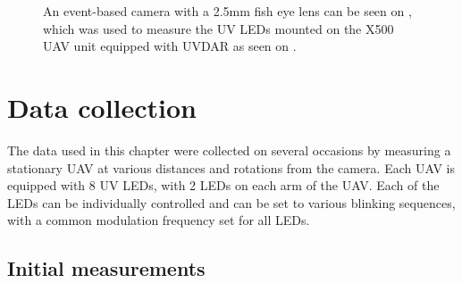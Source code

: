 \begin{figure}[H]
	\centering
	\caption{
  An event-based camera with a 2.5mm fish eye lens can be seen on , which was used to measure the UV LEDs mounted on the X500 UAV unit equipped with UVDAR as seen on .
  }
	\label{fig:uavcam}
\end{figure}

\section{Data collection}

The data used in this chapter were collected on several occasions by measuring a stationary \ac{UAV} at various distances and rotations from the camera.
Each \ac{UAV} is equipped with 8 \ac{UV} \ac{LED}s, with 2 \ac{LED}s on each arm of the \ac{UAV}. Each of the \ac{LED}s can be individually controlled
and can be set to various blinking sequences, with a common modulation frequency set for all \ac{LED}s.

\subsection{Initial measurements}

